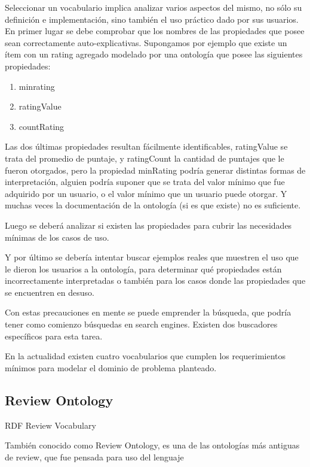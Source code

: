 Seleccionar un vocabulario implica analizar varios aspectos del mismo, no sólo su definición e implementación, sino también el uso práctico dado por sus usuarios. 
En primer lugar se debe comprobar que los nombres de las propiedades que posee sean correctamente auto-explicativas. Supongamos por ejemplo que existe un ítem con un rating agregado modelado por una ontología que posee las siguientes propiedades:

\begin{enumerate}
\item minrating
\item ratingValue
\item countRating
\end{enumerate}


Las dos últimas propiedades resultan fácilmente identificables, ratingValue se trata del promedio de puntaje, y ratingCount 
la cantidad de puntajes que le fueron otorgados, pero la propiedad minRating podría generar distintas formas de interpretación, 
alguien podría suponer que se trata del valor mínimo que fue adquirido por un usuario, o el valor mínimo que un usuario puede 
otorgar. Y muchas veces la documentación de la ontología (si es que existe) no es suficiente.

Luego se deberá analizar si existen las propiedades para cubrir las necesidades mínimas de los casos de uso.

Y por último se debería intentar buscar ejemplos reales que muestren el uso que le dieron los usuarios a la ontología, para 
determinar qué propiedades están incorrectamente interpretadas o también para los casos donde las propiedades que se encuentren 
en desuso.

Con estas precauciones en mente se puede emprender la búsqueda, que podría tener como comienzo búsquedas en  search engines. 
Existen dos buscadores específicos para esta tarea.

En la actualidad existen cuatro vocabularios que cumplen los requerimientos mínimos para modelar el dominio de problema planteado.

\subsection{Review Ontology}

RDF Review Vocabulary

También conocido como Review Ontology, es una de las ontologías más antiguas de review, que fue pensada para uso del lenguaje 

